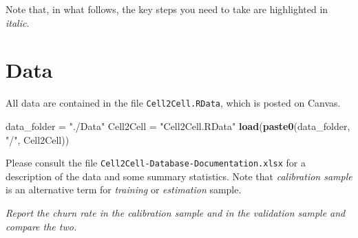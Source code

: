 \documentclass[
]{article}
\newenvironment{Shaded}{\begin{snugshade}}{\end{snugshade}}
\newcommand{\CommentTok}[1]{\textcolor[rgb]{0.56,0.35,0.01}{\textit{#1}}}
\newcommand{\DecValTok}[1]{\textcolor[rgb]{0.00,0.00,0.81}{#1}}
\newcommand{\FunctionTok}[1]{\textcolor[rgb]{0.13,0.29,0.53}{\textbf{#1}}}
\newcommand{\NormalTok}[1]{#1}
\newcommand{\OtherTok}[1]{\textcolor[rgb]{0.56,0.35,0.01}{#1}}
\newcommand{\SpecialCharTok}[1]{\textcolor[rgb]{0.81,0.36,0.00}{\textbf{#1}}}
\newcommand{\StringTok}[1]{\textcolor[rgb]{0.31,0.60,0.02}{#1}}
\begin{document}
Note that, in what follows, the key steps you need to take are
highlighted in \emph{italic}.

\newpage

\section{Data}\label{data}

All data are contained in the file \texttt{Cell2Cell.RData}, which is
posted on Canvas.

\begin{Shaded}
\begin{Highlighting}[]
\NormalTok{data\_folder    }\OtherTok{=} \StringTok{"./Data"}
\NormalTok{Cell2Cell }\OtherTok{=} \StringTok{"Cell2Cell.RData"}
\FunctionTok{load}\NormalTok{(}\FunctionTok{paste0}\NormalTok{(data\_folder, }\StringTok{"/"}\NormalTok{, Cell2Cell))}
\end{Highlighting}
\end{Shaded}

\medskip

Please consult the file \texttt{Cell2Cell-Database-Documentation.xlsx}
for a description of the data and some summary statistics. Note that
\emph{calibration sample} is an alternative term for \emph{training} or
\emph{estimation} sample.

\emph{Report the churn rate in the calibration sample and in the
validation sample and compare the two.}

\begin{Shaded}
\end{Shaded}
\end{document}
